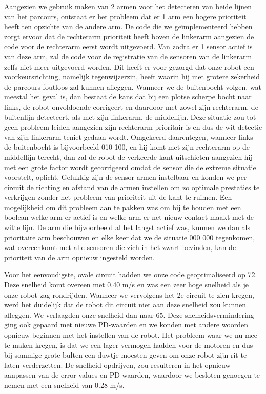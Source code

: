 Aangezien we gebruik maken van 2 armen voor het detecteren van beide lijnen van het parcours, ontstaat er het probleem dat er 1 arm een hogere prioriteit heeft ten opzichte van de andere arm. De code die we ge\"implementeerd hebben zorgt ervoor dat de rechterarm prioriteit heeft boven de linkerarm aangezien de code voor de rechterarm eerst wordt uitgevoerd. Van zodra er 1 sensor actief is van deze arm, zal de code voor de registratie van de sensoren van de linkerarm zelfs niet meer uitgevoerd worden. Dit heeft er voor gezorgd dat onze robot een voorkeursrichting, namelijk tegenwijzerzin, heeft waarin hij met grotere zekerheid de parcours foutloos zal kunnen afleggen. Wanneer we de buitenbocht volgen, wat meestal het geval is, dan bestaat de kans dat bij een plotse scherpe bocht naar links, de robot onvoldoende corrigeert en daardoor met zowel zijn rechterarm, de buitenlijn detecteert, als met zijn linkerarm, de middellijn. Deze situatie zou tot geen probleem leiden aangezien zijn rechterarm prioritair is en dus de wit-detectie van zijn linkerarm teniet gedaan wordt. Omgekeerd daarentegen, wanneer links de buitenbocht is bijvoorbeeld 010 100, en hij komt met zijn rechterarm op de middellijn terecht, dan zal de robot de verkeerde kant uitschieten aangezien hij met een grote factor wordt gecorrigeerd omdat de sensor die de extreme situatie voorstelt, oplicht. Gelukkig zijn de sensor-armen instelbaar en konden we per circuit de richting en afstand van de armen instellen om zo optimale prestaties te verkrijgen zonder het probleem van prioriteit uit de kant te ruimen. Een mogelijkheid om dit probleem aan te pakken was om bij te houden met een boolean welke arm er actief is en welke arm er net nieuw contact maakt met de witte lijn. De arm die bijvoorbeeld al het langst actief was, kunnen we dan als prioritaire arm beschouwen en elke keer dat we de situatie 000 000 tegenkomen, wat overeenkomt met alle sensoren die zich in het zwart bevinden, kan de prioriteit van de arm opnieuw ingesteld worden.

Voor het eenvoudigste, ovale circuit hadden we onze code geoptimaliseerd op 72. Deze snelheid komt overeen met 0.40 m/s en was een zeer hoge snelheid als je onze robot zag rondrijden. Wanneer we vervolgens het 2e circuit te zien kregen, werd het duidelijk dat de robot dit circuit niet aan deze snelheid zou kunnen afleggen. We verlaagden onze snelheid dan naar 65. Deze snelheidsvermindering ging ook gepaard met nieuwe PD-waarden en we konden met andere woorden opnieuw beginnen met het instellen van de robot. Het probleem waar we nu mee te maken kregen, is dat we een lager vermogen hadden voor de motoren en dus bij sommige grote bulten een duwtje moesten geven om onze robot zijn rit te laten verderzetten. De snelheid opdrijven, zou resulteren in het opnieuw aanpassen van de error values en PD-waarden, waardoor we besloten genoegen te nemen met een snelheid van 0.28 m/s.

